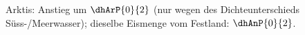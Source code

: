 Arktis: Anstieg um $\dhArP{0}{2}$ (nur wegen des Dichteunterschieds Süss-/Meerwasser); dieselbe Eismenge vom Festland: $\dhAnP{0}{2}$.
